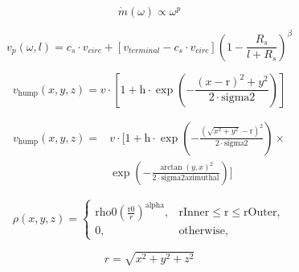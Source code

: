\documentclass[a4paper,14pt]{extarticle}
\begin{document}
\begin{equation*}
    \dot{m}(\omega) \propto \omega^p
\end{equation*}

\begin{equation*}
    v_p(\omega, l) = c_s \cdot v_{circ} + \left[ v_{terminal} - c_s \cdot v_{circ}\right]\left(1 - \frac{R_s}{l + R_s} \right)^\beta
\end{equation*}

\begin{equation*}
v_{\mathrm{hump}}(\mathit{x},\mathit{y},\mathit{z}) = 
v \cdot \left[1 + \mathrm{h} \cdot \exp\left(
        -\frac{(\mathit{x}-\mathrm{r})^2 + \mathit{y}^2}
        {2 \cdot \mathrm{sigma2}} 
        \right) \right]
\end{equation*}

\begin{equation*}\begin{aligned}
     v_{\mathrm{hump}}(\mathit{x},\mathit{y},\mathit{z}) = &
     v \cdot\Biggl[1 + \mathrm{h} \cdot \exp\left(
        -\frac{(\sqrt{\mathit{x}^2 + \mathit{y}^2}-\mathrm{r})^2}{2 \cdot \mathrm{sigma2}} \right) \times  \\ 
      &  \exp\left(
        -\frac{\arctan(y, x)^2}{2 \cdot \mathrm{sigma2azimuthal}} \right)\Biggr]             
\end{aligned}\end{equation*}

\begin{equation*}
\rho(\mathit{x},\mathit{y},\mathit{z}) = \begin{cases}
               \mathrm{rho0} \left(\frac{\mathrm{r0}}{r}\right)^\mathrm{alpha},       &  \mathrm{rInner} \le \mathrm{r} \le  \mathrm{rOuter}, \\
               0,& \text{otherwise},          \end{cases}
\end{equation*}

\begin{equation*}
 r=\sqrt{\mathit{x}^2+\mathit{y}^2+\mathit{z}^2}
\end{equation*}
\end{document}
